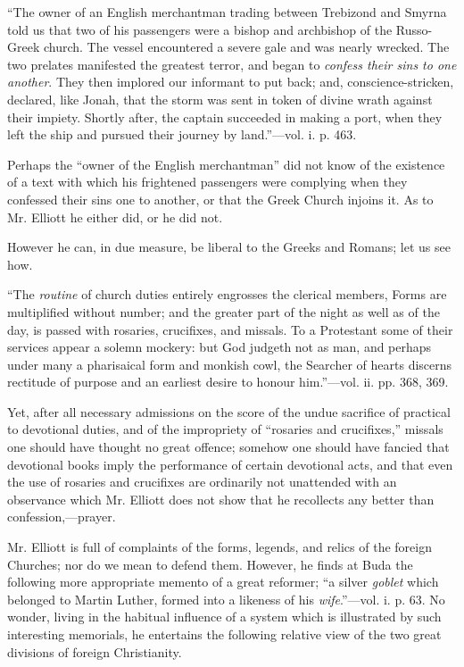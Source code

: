 ``The
owner of an English merchantman trading between Trebizond and Smyrna
told us that two of his passengers were a bishop and archbishop of the
Russo-Greek church. The vessel encountered a severe gale and was nearly
wrecked. The two prelates manifested the greatest terror, and began to \emph{confess
their sins to one another}. They then implored our informant to put
back; and, conscience-stricken, declared, like Jonah, that the storm was
sent in token of divine wrath against their impiety. Shortly after, the
captain succeeded in making a port, when they left the ship and pursued
their journey by land.''—vol. i. p. 463.

Perhaps the
``owner of the English merchantman'' did not know of the existence of a
text with which his frightened passengers were complying when they
confessed their sins one to another, or that the Greek Church injoins
it. As to Mr. Elliott he either did, or he did not.

However he
can, in due measure, be liberal to the Greeks and Romans; let us see
how.

``The
\emph{routine} of church duties entirely engrosses the clerical members,
Forms are multiplified without number; and the greater part of the night
as well as of the day, is passed with rosaries, crucifixes, and missals.
To a Protestant some of their services appear a solemn mockery: but God
judgeth not as man, and perhaps under many a pharisaical form and
monkish cowl, the Searcher of hearts discerns rectitude of purpose and
an earliest desire to honour him.''—vol. ii. pp. 368, 369.

Yet, after
all necessary admissions on the score of the undue sacrifice of
practical to devotional duties, and of the impropriety of ``rosaries and
crucifixes,'' missals one should have thought no great offence; somehow
one should have fancied that devotional books imply the performance of
certain devotional acts, and that even the use of rosaries and
crucifixes are ordinarily not unattended with an observance which Mr.
Elliott does not show that he recollects any better than
confession,—prayer.

Mr. Elliott
is full of complaints of the forms, legends, and relics of the foreign
Churches; nor do we mean to defend them. However, he finds at Buda the
following more appropriate memento of a great reformer; ``a silver \emph{goblet}
which belonged to Martin Luther, formed into a likeness of his \emph{wife}.''—vol.
i. p. 63. No wonder, living in the habitual influence of a system which
is illustrated by such interesting memorials, he entertains the
following relative view of the two great divisions of foreign
Christianity.


